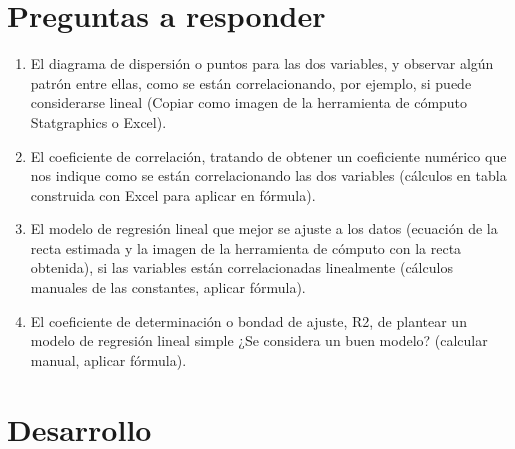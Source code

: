 \documentclass[conference]{IEEEtran}
\begin{document}
\section{Preguntas a responder}

\begin{enumerate}
	\item El diagrama de dispersión o puntos para las dos variables, y observar algún patrón entre
	      ellas, como se están correlacionando, por ejemplo, si puede considerarse lineal (Copiar
	      como imagen de la herramienta de cómputo Statgraphics o Excel).

	\item El coeficiente de correlación, tratando de obtener un coeficiente numérico que nos
	      indique como se están correlacionando las dos variables (cálculos en tabla construida
	      con Excel para aplicar en fórmula).

	\item El modelo de regresión lineal que mejor se ajuste a los datos (ecuación de la recta
	      estimada y la imagen de la herramienta de cómputo con la recta obtenida), si las
	      variables están correlacionadas linealmente (cálculos manuales de las constantes,
	      aplicar fórmula).

	\item El coeficiente de determinación o bondad de ajuste, R2, de plantear un modelo de
	      regresión lineal simple ¿Se considera un buen modelo? (calcular manual, aplicar
	      fórmula).
\end{enumerate}

\section{Desarrollo}
\end{document}
